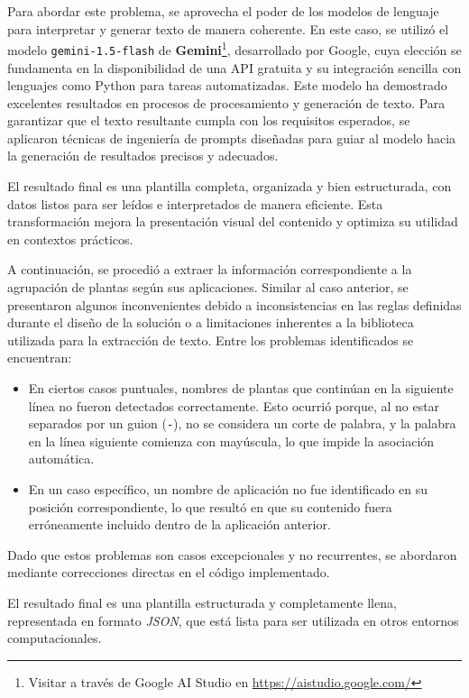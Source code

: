 Para abordar este problema, se aprovecha el poder de los modelos de lenguaje para interpretar y 
generar texto de manera coherente. En este caso, se utilizó el modelo \texttt{gemini-1.5-flash} de
\textbf{Gemini}\footnote{Visitar a través de Google AI Studio en \url{https://aistudio.google.com/}}, desarrollado por Google, 
cuya elección se fundamenta en la disponibilidad de una API gratuita y su integración sencilla con lenguajes 
como Python para tareas automatizadas. Este modelo ha demostrado excelentes resultados en procesos de 
procesamiento y generación de texto. Para garantizar que el texto resultante cumpla con los requisitos esperados, 
se aplicaron técnicas de ingeniería de prompts diseñadas para guiar al modelo hacia la generación de resultados 
precisos y adecuados.

El resultado final es una plantilla completa, organizada y bien estructurada, con datos listos para ser leídos 
e interpretados de manera eficiente. Esta transformación mejora la presentación visual del contenido  
y optimiza su utilidad en contextos prácticos.

A continuación, se procedió a extraer la información correspondiente a la agrupación de plantas según sus aplicaciones. 
Similar al caso anterior, se presentaron algunos inconvenientes debido a inconsistencias en las reglas definidas 
durante el diseño de la solución o a limitaciones inherentes a la biblioteca utilizada para la extracción de texto. 
Entre los problemas identificados se encuentran:
 
\begin{itemize}
    \item En ciertos casos puntuales, nombres de plantas que continúan en la siguiente línea no fueron 
    detectados correctamente. Esto ocurrió porque, al no estar separados por un guion (\texttt{-}), 
    no se considera un corte de palabra, y la palabra en la línea siguiente comienza con mayúscula, 
    lo que impide la asociación automática.
    \item En un caso específico, un nombre de aplicación no fue identificado en su posición correspondiente, 
    lo que resultó en que su contenido fuera erróneamente incluido dentro de la aplicación anterior.
\end{itemize}

Dado que estos problemas son casos excepcionales y no recurrentes, se abordaron mediante correcciones 
directas en el código implementado.

El resultado final es una plantilla estructurada y completamente llena, representada en formato \textit{JSON}, 
que está lista para ser utilizada en otros entornos computacionales. 




